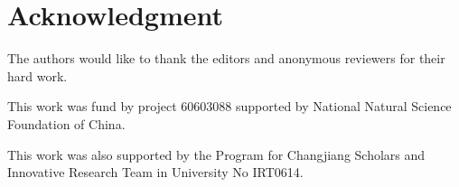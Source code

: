\documentclass[journal]{IEEEtran}
\begin{document}



\section*{Acknowledgment}

The authors would like to thank the editors and anonymous reviewers for their hard work.

This work was fund by project 60603088 supported by National Natural Science Foundation of China.

This work was also supported by the Program for Changjiang
Scholars and Innovative Research Team in University No
IRT0614.
\ifCLASSOPTIONcaptionsoff
  \newpage
\fi





%
%
%
%
\end{document}
